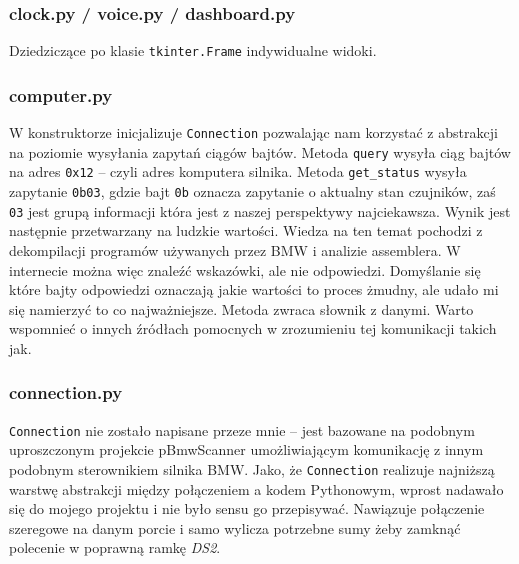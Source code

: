 \documentclass[declaration,shortabstract, inz]{iithesis}
\begin{document}
\subsubsection{clock.py / voice.py / dashboard.py}
    Dziedziczące po klasie \texttt{tkinter.Frame} indywidualne widoki.


\subsubsection{computer.py}
% 
    W konstruktorze inicjalizuje \texttt{Connection} pozwalając nam korzystać z abstrakcji na poziomie wysyłania zapytań ciągów bajtów. Metoda \texttt{query} wysyła ciąg bajtów na adres \texttt{0x12} -- czyli adres komputera silnika\cite{ds2_ecu}. Metoda \texttt{get_status} wysyła zapytanie \texttt{0b03}, gdzie bajt \texttt{0b} oznacza zapytanie o aktualny stan czujników, zaś \texttt{03} jest grupą informacji która jest z naszej perspektywy najciekawsza.
    Wynik jest następnie przetwarzany na ludzkie wartości. Wiedza na ten temat pochodzi z dekompilacji programów używanych przez BMW i analizie assemblera. W internecie można więc znaleźć wskazówki, ale nie odpowiedzi. Domyślanie się które bajty odpowiedzi oznaczają jakie wartości to proces żmudny, ale udało mi się namierzyć to co najważniejsze. Metoda zwraca słownik z danymi. Warto wspomnieć o innych źródłach pomocnych w zrozumieniu tej komunikacji takich jak\cite{kline}\cite{eike}\cite{ds2pp}\cite{edblib}.

    
\subsubsection{connection.py}
% 
    \texttt{Connection} nie zostało napisane przeze mnie -- jest bazowane na podobnym uproszczonym projekcie pBmwScanner\cite{pBmwScanner} umożliwiającym komunikację z innym podobnym sterownikiem silnika BMW. Jako, że \texttt{Connection} realizuje najniższą warstwę abstrakcji między połączeniem a kodem Pythonowym, wprost nadawało się do mojego projektu i nie było sensu go przepisywać. Nawiązuje połączenie szeregowe na danym porcie i samo wylicza potrzebne sumy żeby zamknąć polecenie w poprawną ramkę \textit{DS2}\cite{ds2}.
\end{document}
